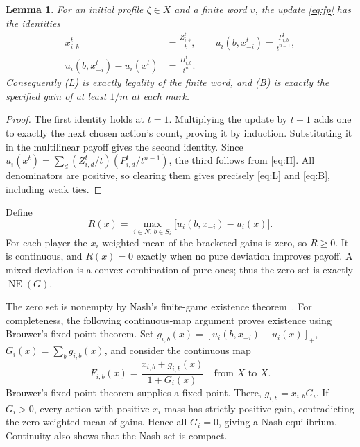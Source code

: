 \documentclass[11pt,a4paper]{article}
\newtheorem{lemma}[theorem]{Lemma}
\theoremstyle{definition}
\DeclareMathOperator{\NE}{NE}
\begin{document}
\begin{lemma}\label{lem:finite}
For an initial profile $\zeta\in X$ and a finite word $v$, the update
\eqref{eq:fp} has the identities
\begin{equation}\label{eq:identity}
 \begin{aligned}
 x_{i,b}^t&=\frac{Z_{i,b}^t}{t},\qquad
 u_i(b,x_{-i}^t)=\frac{P_{i,b}^t}{t^{n-1}},\\
 u_i(b,x_{-i}^t)-u_i(x^t)&=\frac{H_{i,b}^t}{t^n}.
 \end{aligned}
\end{equation}
Consequently \textup{(L)} is exactly legality of the finite word, and
\textup{(B)} is exactly the specified gain of at least $1/m$ at each mark.
\end{lemma}

\begin{proof}
The first identity holds at $t=1$. Multiplying the update by $t+1$ adds
one to exactly the next chosen action's count, proving it by induction.
Substituting it in the multilinear payoff gives the second identity.
Since
$u_i(x^t)=\sum_d(Z_{i,d}^t/t)(P_{i,d}^t/t^{n-1})$,
the third follows from \eqref{eq:H}. All denominators are positive, so
clearing them gives precisely \eqref{eq:L} and \eqref{eq:B}, including
weak ties.
\end{proof}

Define
\begin{equation}\label{eq:residual}
 R(x)=\max_{i\in N,\,b\in S_i}
 \bigl[u_i(b,x_{-i})-u_i(x)\bigr].
\end{equation}
For each player the $x_i$-weighted mean of the bracketed gains is zero,
so $R\ge0$. It is continuous, and $R(x)=0$ exactly when no pure deviation
improves payoff. A mixed deviation is a convex combination of pure ones;
thus the zero set is exactly $\NE(G)$.

The zero set is nonempty by Nash's finite-game existence theorem~\cite{nash}.
For completeness, the following continuous-map argument proves existence
using Brouwer's fixed-point theorem.
Set $g_{i,b}(x)=[u_i(b,x_{-i})-u_i(x)]_+$,
$G_i(x)=\sum_b g_{i,b}(x)$, and consider the continuous map
\[
 F_{i,b}(x)=\frac{x_{i,b}+g_{i,b}(x)}{1+G_i(x)}
 \quad\text{from }X\text{ to }X.
\]
Brouwer's fixed-point theorem supplies a fixed point. There,
$g_{i,b}=x_{i,b}G_i$. If $G_i>0$, every action with positive $x_i$-mass
has strictly positive gain, contradicting the zero weighted mean of gains.
Hence all $G_i=0$, giving a Nash equilibrium. Continuity also shows that
the Nash set is compact.
\end{document}
